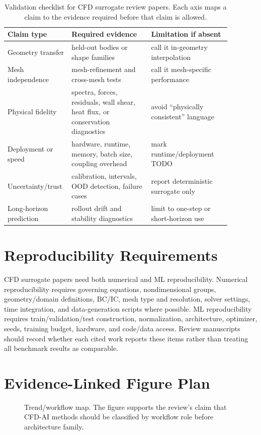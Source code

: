 \documentclass[11pt]{article}
\begin{document}
\begin{table}[t]
\centering
\caption{Validation checklist for CFD surrogate review papers. Each axis maps a claim to the evidence required before that claim is allowed.}
\begin{tabular}{p{0.20\linewidth}p{0.34\linewidth}p{0.34\linewidth}}
\toprule
Claim type & Required evidence & Limitation if absent \\
\midrule
Geometry transfer & held-out bodies or shape families & call it in-geometry interpolation \\
Mesh independence & mesh-refinement and cross-mesh tests & call it mesh-specific performance \\
Physical fidelity & spectra, forces, residuals, wall shear, heat flux, or conservation diagnostics & avoid ``physically consistent'' language \\
Deployment or speed & hardware, runtime, memory, batch size, coupling overhead & mark runtime/deployment TODO \\
Uncertainty/trust & calibration, intervals, OOD detection, failure cases & report deterministic surrogate only \\
Long-horizon prediction & rollout drift and stability diagnostics & limit to one-step or short-horizon use \\
\bottomrule
\end{tabular}
\end{table}

\section{Reproducibility Requirements}
CFD surrogate papers need both numerical and ML reproducibility. Numerical reproducibility requires governing equations, nondimensional groups, geometry/domain definitions, BC/IC, mesh type and resolution, solver settings, time integration, and data-generation scripts where possible. ML reproducibility requires train/validation/test construction, normalization, architecture, optimizer, seeds, training budget, hardware, and code/data access. Review manuscripts should record whether each cited work reports these items rather than treating all benchmark results as comparable.

\section{Evidence-Linked Figure Plan}
\begin{figure}[t]
\centering
{}
\caption{Trend/workflow map. The figure supports the review's claim that CFD-AI methods should be classified by workflow role before architecture family.}
\end{figure}
\end{document}
